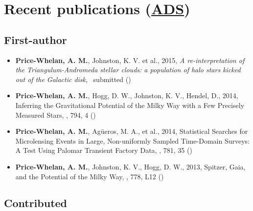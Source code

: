 \documentclass[12pt,letterpaper]{article}
\begin{document}
\section*{Recent publications (\href{\adsurl}{ADS})}
	\subsection*{First-author}
	\begin{itemize}

\item {\bf Price-Whelan, A. M.}, Johnston, K. V. et al., 2015,
    \emph{A re-interpretation of the Triangulum-Andromeda stellar clouds: a population of halo stars kicked out of the Galactic disk},
    \mnras\ submitted ()

\item {\bf Price-Whelan, A. M.}, Hogg, D. W., Johnston, K. V., Hendel, D., 2014,
    {Inferring the Gravitational Potential of the Milky Way with a Few Precisely Measured Stars},
    \apj, 794, 4 ()
    
\item {\bf Price-Whelan, A. M.}, Ag\"ueros, M. A., et al., 2014,
    {Statistical Searches for Microlensing Events in Large, Non-uniformly Sampled Time-Domain Surveys: A Test Using Palomar Transient Factory Data},
    \apj, 781, 35 ()
    
\item {\bf Price-Whelan, A. M.}, Johnston, K. V., Hogg, D. W., 2013,
    {Spitzer, Gaia, and the Potential of the Milky Way},
    \apjl, 778, L12 ()

	\end{itemize}

	\subsection*{Contributed}
\end{document}
